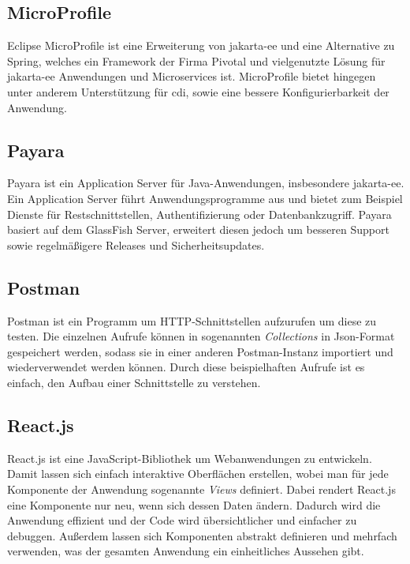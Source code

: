 \documentclass[12pt,twoside,a4paper]{article}
\begin{document}
\begin{sloppypar}
\subsection{MicroProfile}\label{sec:microprofile}
Eclipse MicroProfile ist eine Erweiterung von \acrshort{jakarta-ee} und eine Alternative zu Spring, welches ein Framework der Firma Pivotal und vielgenutzte Lösung für \acrshort{jakarta-ee} Anwendungen und Microservices ist.\newline
MicroProfile bietet hingegen unter anderem Unterstützung für \acrfull{cdi}, sowie eine bessere Konfigurierbarkeit der Anwendung.\newline\cite{microprofile}
\subsection{Payara}
Payara ist ein Application Server für Java-Anwendungen, insbesondere \acrshort{jakarta-ee}. Ein Application Server führt Anwendungsprogramme aus und bietet zum Beispiel Dienste für Restschnittstellen, Authentifizierung oder Datenbankzugriff. \cite{app-server}\newline
Payara basiert auf dem GlassFish Server, erweitert diesen jedoch um besseren Support sowie regelmäßigere Releases und Sicherheitsupdates.\newline\cite{payara-vs-glassfish}
\subsection{Postman}\label{sec:postman}
Postman ist ein Programm um HTTP-Schnittstellen aufzurufen um diese zu testen. Die einzelnen Aufrufe können in sogenannten \textit{Collections} in Json-Format gespeichert werden, sodass sie in einer anderen Postman-Instanz importiert und wiederverwendet werden können. Durch diese beispielhaften Aufrufe ist es einfach, den Aufbau einer Schnittstelle zu verstehen.
\subsection{React.js}\label{sec:react}
React.js ist eine JavaScript-Bibliothek um Webanwendungen zu entwickeln. Damit lassen sich einfach interaktive Oberflächen erstellen, wobei man für jede Komponente der Anwendung sogenannte \textit{Views} definiert. Dabei rendert React.js eine Komponente nur neu, wenn sich dessen Daten ändern. Dadurch wird die Anwendung effizient und der Code wird übersichtlicher und einfacher zu debuggen. Außerdem lassen sich Komponenten abstrakt definieren und mehrfach verwenden, was der gesamten Anwendung ein einheitliches Aussehen gibt. \cite{react}

\end{sloppypar}
\end{document}
